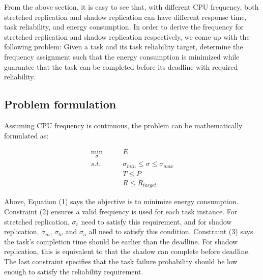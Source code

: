From the above section, it is easy to see that, with different CPU frequency, both stretched replication and shadow replication can have different response time, task reliability, and energy consumption. In order to derive the frequency for stretched replication and shadow replication respectively, we come up with the following problem: Given a task and its task reliability target, determine the frequency assignment such that the energy consumption is minimized while guarantee that the task can be completed before its deadline with required reliability. 

\subsection{Problem formulation}
Assuming CPU frequency is continuous, the problem can be mathematically formulated as:

\begin{align}
\min_{\sigma}\quad\quad    & E \\
s.t.              \quad\quad                   & \sigma_{min} \leq \sigma \leq \sigma_{max} \\
                                     & T \leq P \\
                                     & R \leq R_{target} 
\end{align} 


Above, Equation (1) says the objective is to minimize energy consumption. Constraint (2) ensures a valid frequency is used for each task instance. For stretched replication, $\sigma_r$ need to satisfy this requirement, and for shadow replication, $\sigma_m$, $\sigma_b$, and $\sigma_a$ all need to satisfy this condition. Constraint (3) says the task's completion time should be earlier than the deadline. For shadow replication, this is equivalent to that the shadow can complete before deadline. The last constraint specifies that the task failure probability should be low enough to satisfy the reliability requirement. 

